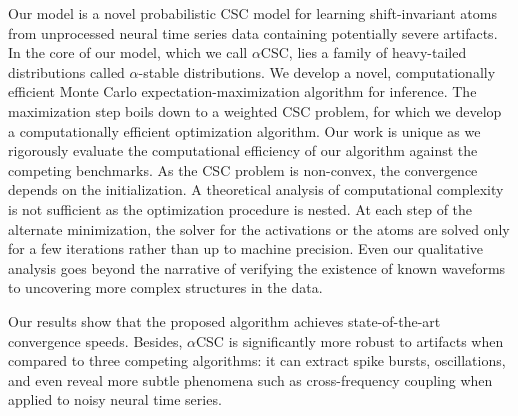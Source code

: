 Our model is a novel probabilistic \ac{CSC} model for learning shift-invariant atoms from unprocessed neural time series data containing
potentially severe artifacts.
In the core of our model, which we call $\alpha$CSC, lies a family of heavy-tailed
distributions called $\alpha$-stable distributions. We develop a novel, computationally efficient Monte Carlo
expectation-maximization algorithm for inference. The maximization step boils down to a weighted
\ac{CSC} problem, for which we develop a computationally efficient optimization algorithm.
Our work is unique as we rigorously evaluate the computational efficiency of our algorithm against the competing benchmarks. As the \ac{CSC} problem is non-convex, the convergence depends on the initialization. A theoretical analysis of computational complexity is not sufficient as the optimization procedure is nested. At each step of the alternate minimization, the solver for the activations or the atoms are solved only for a few iterations rather than up to machine precision. Even our qualitative analysis goes beyond the narrative of verifying the existence of known waveforms to uncovering more complex structures in the data.

Our results
show that the proposed algorithm achieves state-of-the-art convergence speeds. Besides, $\alpha$CSC is
significantly more robust to artifacts when compared to three competing algorithms: it can extract
spike bursts, oscillations, and even reveal more subtle phenomena such as cross-frequency coupling
when applied to noisy neural time series.


\noindent{}%

\clearpage

